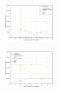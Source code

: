 \documentclass[xcolor=dvipsnames]{beamer}
\begin{document}
\begin{frame}
  \includegraphics[width=0.2\textwidth]{includes/leakage_shutdowns_agg_generation_cntlreg.png}

  \includegraphics[width=0.2\textwidth]{includes/no_leakage_shutdowns_agg_generation_cntlreg.png}

\end{frame}
\end{document}
